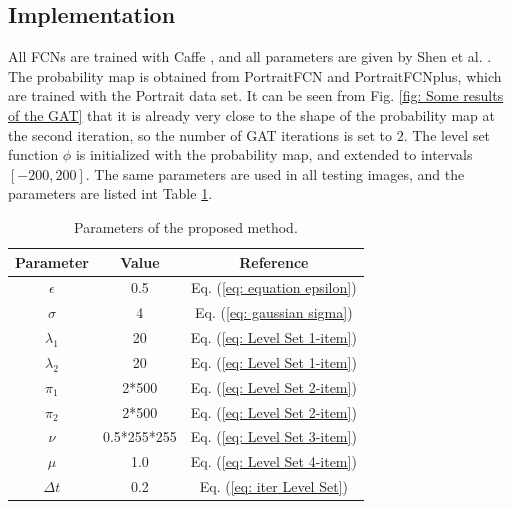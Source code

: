 \subsection{Implementation}
All FCNs are trained with Caffe \cite{FCN:caffe:jia2014caffe}, and all parameters are given by Shen et al. \cite{FCN:segmentation:shen2016automatic}. The probability map is obtained from PortraitFCN and PortraitFCNplus, which are trained with the Portrait data set.
It can be seen from Fig. \ref{fig: Some results of the GAT} that it is already very close to the shape of the probability map at the second iteration, so the number of GAT iterations is set to $2$. The level set function $\phi$ is initialized with the probability map, and extended to intervals $[-200, 200]$. The same parameters are used in all testing images, and the parameters are listed int Table \ref{table: Parameters of the proposed method}.
\begin{table}[h]
    \centering
    \caption{Parameters of the proposed method.}\label{table: Parameters of the proposed method}
    \begin{tabular}{c|c|c}
        \hline
        \hline
        Parameter & Value & Reference \\
        \hline
        $\epsilon$ & 0.5 & Eq. (\ref{eq: equation epsilon}) \\
        $\sigma$ & 4 & Eq. (\ref{eq: gaussian sigma}) \\
        $\lambda_1$ & 20 & Eq. (\ref{eq: Level Set 1-item}) \\
        $\lambda_2$ & 20 & Eq. (\ref{eq: Level Set 1-item}) \\
        $\pi_1$ & 2*500 & Eq. (\ref{eq: Level Set 2-item}) \\
        $\pi_2$ & 2*500 & Eq. (\ref{eq: Level Set 2-item}) \\
        $\nu$ & 0.5*255*255 & Eq. (\ref{eq: Level Set 3-item}) \\
        $\mu$ & 1.0 & Eq. (\ref{eq: Level Set 4-item}) \\
        $\Delta t$ & 0.2 & Eq. (\ref{eq: iter Level Set}) \\
        \hline
        \hline
    \end{tabular}
\end{table}

